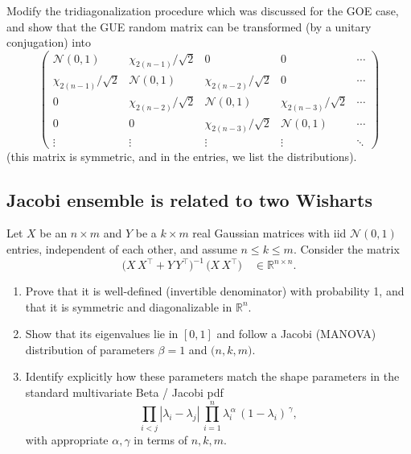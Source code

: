 \documentclass[letterpaper,11pt,oneside,reqno]{article}
\numberwithin{equation}{section}
\theoremstyle{definition}
\begin{document}
Modify the tridiagonalization procedure which was discussed
for the GOE case, and show that the
GUE random matrix can be transformed (by a unitary conjugation)
into
\begin{equation*}
	\begin{pmatrix}
		\mathcal{N}(0,1) & \chi_{2(n-1)}/\sqrt{2} & 0 & 0 & \cdots \\
		\chi_{2(n-1)}/\sqrt{2} & \mathcal{N}(0,1) & \chi_{2(n-2)}/\sqrt{2} & 0 & \cdots \\
		0 & \chi_{2(n-2)}/\sqrt{2} & \mathcal{N}(0,1) & \chi_{2(n-3)}/\sqrt{2} & \cdots \\
		0 & 0 & \chi_{2(n-3)}/\sqrt{2} & \mathcal{N}(0,1) & \cdots \\
		\vdots & \vdots & \vdots & \vdots & \ddots
	\end{pmatrix}
\end{equation*}
(this matrix is symmetric, and in the entries, we list the
distributions).






\subsection{Jacobi ensemble is related to two Wisharts}
\label{prob:jacobi-two-wisharts}

Let \(X\) be an \(n\times m\) and \(Y\) be a \(k\times m\) real Gaussian matrices with iid \(\mathcal{N}(0,1)\) entries, independent of each other, and assume \(n \le k \le m\). Consider the matrix
\[
  \bigl(X\,X^\top + Y\,Y^\top \bigr)^{-1}\,
  \bigl(X\,X^\top \bigr)
  \quad \in \mathbb{R}^{n\times n}.
\]
\begin{enumerate}
  \item Prove that it is well-defined (invertible denominator) with probability 1, and that it is symmetric and diagonalizable in \(\mathbb{R}^n\).
  \item Show that its eigenvalues lie in \([0,1]\) and follow a Jacobi (MANOVA) distribution of parameters \(\beta=1\) and \(\bigl(n,k,m\bigr)\).
  \item Identify explicitly how these parameters match the shape parameters in the standard multivariate Beta / Jacobi pdf
  \[
     \prod_{i<j} |\lambda_i - \lambda_j| \,\prod_{i=1}^n
     \lambda_i^{\,\alpha}\,(1-\lambda_i)^{\,\gamma},
  \]
  with appropriate \(\alpha,\gamma\) in terms of \(n,k,m\).
\end{enumerate}
\end{document}

